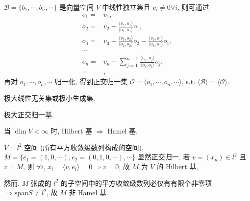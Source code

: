 \documentclass{note}
\begin{document}
\begin{thm}
    $\mathcal{B}=\{b_1,\cdots,b_n,\cdots\}$ 是向量空间 $V$ 中线性独立集且 $v_i\neq 0\forall i$, 则可通过
    \begin{align*}
        o_1=&v_1,\\
        o_2=&v_2-\frac{\langle v_2,o_1\rangle}{\langle o_1,o_1\rangle}o_1,\\
        o_3=&v_3-\frac{\langle v_3,o_2\rangle}{\langle o_2,o_2\rangle}o_2-\frac{\langle v_3,o_1\rangle}{\langle o_1,o_1\rangle}o_1,\\
        \cdots&\\
        o_n=&v_n-\sum_{j=1}^{n-1}\frac{\langle v_n,o_j\rangle}{\langle o_j,o_j\rangle}o_j,\\
        \cdots&,
    \end{align*}
    再对 $o_1,\cdots,o_n,\cdots$ 归一化, 得到正交归一集 $\mathcal{O}=\langle o_1,\cdots,o_n,\cdots\rangle$, s.t. $\langle\mathcal{B}\rangle=\langle\mathcal{O}\rangle$.
\end{thm}

\begin{df}[Hamel 基]
    极大线性无关集或极小生成集.
\end{df}

\begin{df}[Hilbert 基]
    极大正交归一基.
\end{df}

\begin{thm}
    当 $\dim V<\infty$ 时, Hilbert 基 $\Longrightarrow$ Hamel 基.
\end{thm}

\begin{eg}
    $V=l^2$ 空间 (所有平方收敛级数列构成的空间), $M=\{e_1=(1,0,\cdots),e_2=(0,1,0,\cdots),\cdots\}$ 显然正交归一. 若 $v=(x_n)\in l^2$ 且 $v\perp M$, 则 $\forall i$, $x_i=\langle v,e_i\rangle=0\Longrightarrow v=0$, 故 $M$ 为 $V$ 的 Hilbert 基, 

    然而, $M$ 张成的 $l^2$ 的子空间中的平方收敛级数列必仅有有限个非零项 $\Longrightarrow\text{span}S\neq l^2$, 故 $M$ 非 Hamel 基.
\end{eg}
\end{document}
